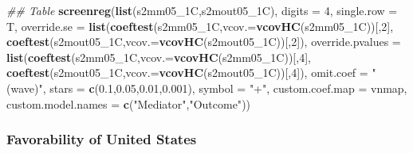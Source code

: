 \documentclass[
]{article}
\newenvironment{Shaded}{\begin{snugshade}}{\end{snugshade}}
\newcommand{\CommentTok}[1]{\textcolor[rgb]{0.56,0.35,0.01}{\textit{#1}}}
\newcommand{\DataTypeTok}[1]{\textcolor[rgb]{0.13,0.29,0.53}{#1}}
\newcommand{\DecValTok}[1]{\textcolor[rgb]{0.00,0.00,0.81}{#1}}
\newcommand{\FloatTok}[1]{\textcolor[rgb]{0.00,0.00,0.81}{#1}}
\newcommand{\KeywordTok}[1]{\textcolor[rgb]{0.13,0.29,0.53}{\textbf{#1}}}
\newcommand{\NormalTok}[1]{#1}
\newcommand{\StringTok}[1]{\textcolor[rgb]{0.31,0.60,0.02}{#1}}
\begin{document}
\begin{Shaded}
\begin{Highlighting}[]
\CommentTok{## Table}
\KeywordTok{screenreg}\NormalTok{(}\KeywordTok{list}\NormalTok{(s2mm05_1C,s2mout05_1C), }\DataTypeTok{digits =} \DecValTok{4}\NormalTok{, }\DataTypeTok{single.row =}\NormalTok{ T,}
          \DataTypeTok{override.se =} \KeywordTok{list}\NormalTok{(}\KeywordTok{coeftest}\NormalTok{(s2mm05_1C,}\DataTypeTok{vcov.=}\KeywordTok{vcovHC}\NormalTok{(s2mm05_1C))[,}\DecValTok{2}\NormalTok{],}
                             \KeywordTok{coeftest}\NormalTok{(s2mout05_1C,}\DataTypeTok{vcov.=}\KeywordTok{vcovHC}\NormalTok{(s2mout05_1C))[,}\DecValTok{2}\NormalTok{]),}
          \DataTypeTok{override.pvalues =} \KeywordTok{list}\NormalTok{(}\KeywordTok{coeftest}\NormalTok{(s2mm05_1C,}\DataTypeTok{vcov.=}\KeywordTok{vcovHC}\NormalTok{(s2mm05_1C))[,}\DecValTok{4}\NormalTok{],}
                                  \KeywordTok{coeftest}\NormalTok{(s2mout05_1C,}\DataTypeTok{vcov.=}\KeywordTok{vcovHC}\NormalTok{(s2mout05_1C))[,}\DecValTok{4}\NormalTok{]),}
          \DataTypeTok{omit.coef =} \StringTok{"(wave)"}\NormalTok{, }\DataTypeTok{stars =} \KeywordTok{c}\NormalTok{(}\FloatTok{0.1}\NormalTok{,}\FloatTok{0.05}\NormalTok{,}\FloatTok{0.01}\NormalTok{,}\FloatTok{0.001}\NormalTok{), }\DataTypeTok{symbol =} \StringTok{"+"}\NormalTok{,}
          \DataTypeTok{custom.coef.map =}\NormalTok{ vnmap, }
          \DataTypeTok{custom.model.names =} \KeywordTok{c}\NormalTok{(}\StringTok{"Mediator"}\NormalTok{,}\StringTok{"Outcome"}\NormalTok{))}
\end{Highlighting}
\end{Shaded}

\hypertarget{favorability-of-united-states}{%
\subsubsection{Favorability of United
States}\label{favorability-of-united-states}}
\end{document}
